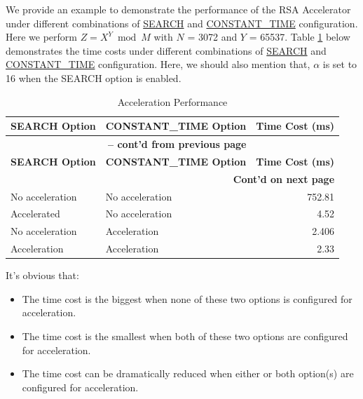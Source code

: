 \documentclass[main\_\_EN.tex]{subfiles}
\begin{document}
We provide an example to demonstrate the performance of the RSA Accelerator under different combinations of \hyperref[regdesc:RSASEARCHENABLEREG]{SEARCH} and \hyperref[regdesc:RSACONSTANTTIMEREG]{CONSTANT\_TIME} configuration. Here we perform \begin{math}Z = X^{Y} \bmod M\end{math} with \begin{math}N\end{math} = 3072 and \begin{math}Y\end{math} = 65537. Table \ref{tab:accelerationeffect} below demonstrates the time costs under different combinations of \hyperref[regdesc:RSASEARCHENABLEREG]{SEARCH} and \hyperref[regdesc:RSACONSTANTTIMEREG]{CONSTANT\_TIME} configuration. Here, we should also mention that, \begin{math} \alpha \end{math} is set to 16 when the SEARCH option is enabled.

\begin{longtable}{ | l | l | r | }
    \caption{Acceleration Performance}\label{tab:accelerationeffect}
    \\\hline
    \rowcolor{lightgray}
        \textbf{SEARCH Option} & \textbf{CONSTANT\_TIME Option} & \textbf{Time Cost (ms)}  \\ \hline
        \endfirsthead
        \multicolumn{3}{c}{\bfseries \tablename\ \thetable{} -- cont'd from previous page}\\\hline
        
        \rowcolor{lightgray}
        \textbf{SEARCH Option} & \textbf{CONSTANT\_TIME Option} & \textbf{Time Cost (ms)}  \\ \hline
        \endhead
        
        \multicolumn{3}{r}{\textbf{Cont'd on next page}} \\
        \endfoot
        \endlastfoot
        \hline
    No acceleration & No acceleration & 752.81   \\ \hline    
    Accelerated & No acceleration & 4.52     \\ \hline
    No acceleration & Acceleration & 2.406     \\ \hline
    Acceleration & Acceleration & 2.33     \\ \hline
\end{longtable}

It's obvious that:
\begin{itemize}
    \item The time cost is the biggest when none of these two options is configured for acceleration.
    \item The time cost is the smallest when both of these two options are configured for acceleration.
    \item The time cost can be dramatically reduced when either or both option(s) are configured for acceleration. 
\end{itemize}
\end{document}
